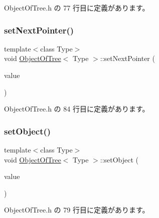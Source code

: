  Object\+Of\+Tree.\+h の 77 行目に定義があります。

\mbox{\label{class_object_of_tree_a44fb225ed189197bcdfe23dcd2a7fe28}} 
\subsubsection{\texorpdfstring{set\+Next\+Pointer()}{setNextPointer()}}
{\footnotesize\ttfamily template$<$class Type$>$ \\
void \mbox{\hyperlink{class_object_of_tree}{Object\+Of\+Tree}}$<$ Type $>$\+::set\+Next\+Pointer (\begin{DoxyParamCaption}\item[{\mbox{\hyperlink{class_object_of_tree}{Object\+Of\+Tree}}$<$ Type $>$ $\ast$}]{value }\end{DoxyParamCaption})\hspace{0.3cm}{\ttfamily [inline]}}



 Object\+Of\+Tree.\+h の 84 行目に定義があります。

\mbox{\label{class_object_of_tree_aae14cb0e8ac8b701de737c547a1d3b8c}} 
\subsubsection{\texorpdfstring{set\+Object()}{setObject()}}
{\footnotesize\ttfamily template$<$class Type$>$ \\
void \mbox{\hyperlink{class_object_of_tree}{Object\+Of\+Tree}}$<$ Type $>$\+::set\+Object (\begin{DoxyParamCaption}\item[{Type}]{value }\end{DoxyParamCaption})\hspace{0.3cm}{\ttfamily [inline]}}



 Object\+Of\+Tree.\+h の 79 行目に定義があります。

\mbox{\label{class_object_of_tree_aa0ec8f6f61eb41f346796141e8ec38d5}} 
